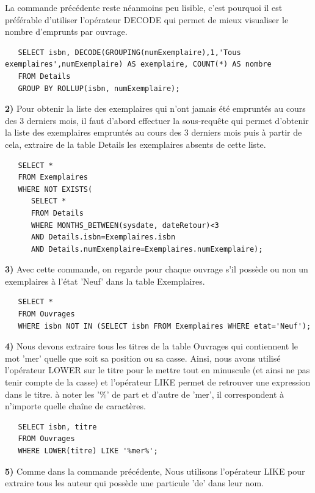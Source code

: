 \documentclass[a4paper,12pt]{article}
\begin{document}
	La commande précédente reste néanmoins peu lisible, c'est pourquoi il est préférable d'utiliser l'opérateur DECODE qui permet de mieux visualiser le nombre d'emprunts par ouvrage.
	
   \begin{lstlisting}
   SELECT isbn, DECODE(GROUPING(numExemplaire),1,'Tous exemplaires',numExemplaire) AS exemplaire, COUNT(*) AS nombre 
   FROM Details 
   GROUP BY ROLLUP(isbn, numExemplaire);
   \end{lstlisting}

   \textbf {2)} Pour obtenir la liste des exemplaires qui n'ont jamais été empruntés au cours des 3 derniers mois, il faut d'abord effectuer la sous-requête qui permet d'obtenir la liste des exemplaires empruntés au cours des 3 derniers mois puis à partir de cela, extraire de la table Details les exemplaires absents de cette liste.
   \begin{lstlisting}
   SELECT * 
   FROM Exemplaires 
   WHERE NOT EXISTS(
      SELECT * 
      FROM Details 
      WHERE MONTHS_BETWEEN(sysdate, dateRetour)<3 
      AND Details.isbn=Exemplaires.isbn 
      AND Details.numExemplaire=Exemplaires.numExemplaire);
   \end{lstlisting}     
     
   \textbf {3)} Avec cette commande, on regarde pour chaque ouvrage s'il possède ou non un exemplaires à l'état 'Neuf' dans la table Exemplaires.
   
   \begin{lstlisting}
   SELECT * 
   FROM Ouvrages 
   WHERE isbn NOT IN (SELECT isbn FROM Exemplaires WHERE etat='Neuf');

   \end{lstlisting}
   
   \textbf {4)} Nous devons extraire tous les titres de la table Ouvrages qui contiennent le mot 'mer' quelle que soit sa position ou sa casse. Ainsi, nous avons utilisé l'opérateur LOWER sur le titre pour le mettre tout en minuscule (et ainsi ne pas tenir compte de la casse) et l'opérateur LIKE permet de retrouver une expression dans le titre. à noter les '\%' de part et d'autre de 'mer', il correspondent à n'importe quelle chaîne de caractères.
   
   \begin{lstlisting}
   SELECT isbn, titre 
   FROM Ouvrages 
   WHERE LOWER(titre) LIKE '%mer%';
   \end{lstlisting}
   
   \textbf {5)} Comme dans la commande précédente, Nous utilisons l'opérateur LIKE pour extraire tous les auteur qui possède une particule 'de' dans leur nom.
   
\end{document}
